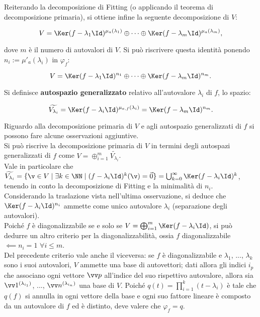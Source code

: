 \documentclass[11pt]{article}
\begin{document}
	Reiterando la decomposizione di Fitting (o applicando il teorema di decomposizione primaria), si ottiene
	infine la seguente decomposizione di $V$:
	
	\[ V = \Ker (f - \lambda_1 \Id)^{\mu_a(\lambda_1)} \oplus \cdots \oplus \Ker (f - \lambda_m \Id)^{\mu_a(\lambda_m)}, \]
	
	dove $m$ è il numero di autovalori di $V$. Si può riscrivere questa identità ponendo $n_i := \mu'_a(\lambda_i)$ in
	$\varphi_f$:
	
	\[ V = \Ker (f - \lambda_1 \Id)^{n_1} \oplus \cdots \oplus \Ker (f - \lambda_m \Id)^{n_m}. \]
	
	\begin{definition}
		Si definisce \textbf{autospazio generalizzato} relativo all'autovalore $\lambda_i$ di $f$, lo spazio:
		
		\[ \widetilde{V_{\lambda_i}} = \Ker (f - \lambda_i \Id)^{\mu_{a, f}(\lambda_i)} = \Ker (f - \lambda_m \Id)^{n_m}. \]
	\end{definition}
	
	\begin{remark} Riguardo alla decomposizione primaria di $V$ e agli autospazio generalizzati di $f$ si possono fare alcune osservazioni aggiuntive. \\
	
		\li Si può riscrive la decomposizione primaria di $V$ in termini degli autospazi generalizzati di $f$ come $V = \oplus_{i=1}^m \widetilde{V_{\lambda_i}}$. \\
		\li Vale in particolare che $\widetilde{V_{\lambda_i}} = \{ \v \in V \mid \exists k \in \NN \mid (f-\lambda_i \Id)^k(\v) = \vec{0} \} = \bigcup_{k=0}^{\infty} \Ker (f - \lambda_i \Id)^k$, tenendo in conto la decomposizione
		di Fitting e la minimalità di $n_i$. \\
		\li Considerando la traslazione vista nell'ultima osservazione, si deduce che $\Ker(f - \lambda_i \Id)^{n_i}$ ammette
		come unico autovalore $\lambda_i$ (separazione degli autovalori). \\
		\li Poiché $f$ è diagonalizzabile se e solo se $V = \bigoplus_{i=1}^m \Ker(f - \lambda_i \Id)$, si può dedurre
		un altro criterio per la diagonalizzabilità, ossia $f$ diagonalizzabile $\impliedby n_i = 1$ $\forall i \leq m$. \\
		\li Del precedente criterio vale anche il viceversa: se $f$ è diagonalizzabile e $\lambda_1$, ..., $\lambda_k$ sono
		i suoi autovalori, $V$ ammette una base di autovettori; dati allora gli indici $i_p$ che associano ogni vettore
		$\vv p$ all'indice del suo rispettivo autovalore, allora sia
		$\vv 1 ^{(\lambda_{i_1})}$, ..., $\vv n ^{(\lambda_{i_n})}$ una base di $V$. Poiché $q(t) = \prod_{i=1}^k (t - \lambda_i)$ è tale che $q(f)$ si annulla in ogni vettore della base e ogni suo fattore lineare è composto da un autovalore di $f$ ed è distinto, deve valere che $\varphi_f = q$.
	\end{remark}
\end{document}
